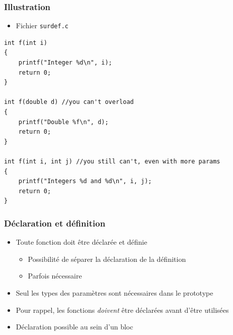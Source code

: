 \begin{frame}[containsverbatim]
\frametitle{Illustration}
\begin{itemize}
\item Fichier \texttt{surdef.c}
\end{itemize}
\begin{lstlisting}
int f(int i)
{
	printf("Integer %d\n", i);
	return 0;
}

int f(double d) //you can't overload
{
	printf("Double %f\n", d);
	return 0;
}

int f(int i, int j) //you still can't, even with more params
{
    printf("Integers %d and %d\n", i, j);
    return 0;
}
\end{lstlisting}
\end{frame}

\begin{frame}
\frametitle{Déclaration et définition}
\begin{itemize}
 \item Toute fonction doit être déclarée et définie
	\begin{itemize}
	\item Possibilité de séparer la déclaration de la définition
	\onslide<3->\item Parfois nécessaire
	\end{itemize}
\end{itemize}
\begin{center}
\end{center}
\begin{itemize}
 \item Seul les types des paramètres sont nécessaires dans le prototype
 \item Pour rappel, les fonctions \emph{doivent} être déclarées avant d'être utilisées
 \item Déclaration possible au sein d'un bloc
\end{itemize}
\end{frame}

